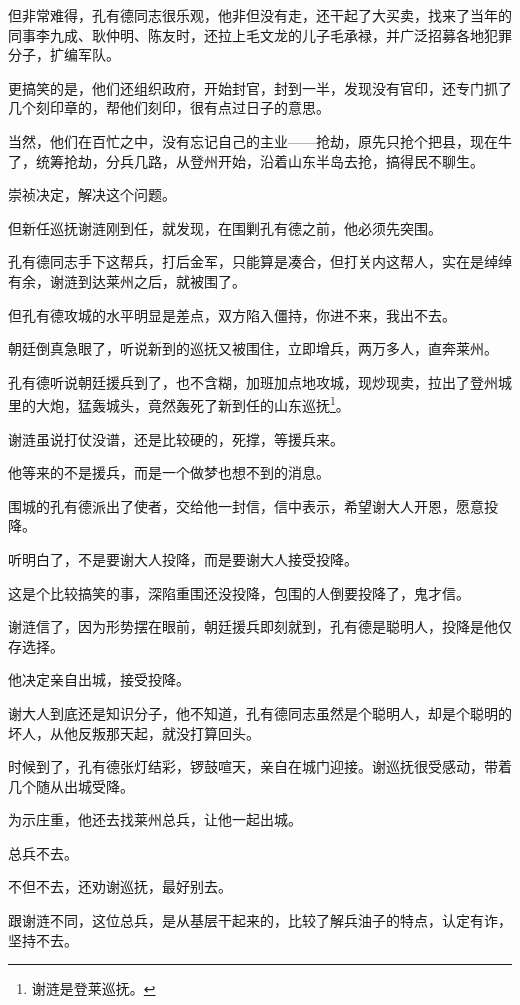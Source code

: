 \begin{multicols}{\theparacolNo}
		但非常难得，孔有德同志很乐观，他非但没有走，还干起了大买卖，找来了当年的同事李九成、耿仲明、陈友时，还拉上毛文龙的儿子毛承禄，并广泛招募各地犯罪分子，扩编军队。

		更搞笑的是，他们还组织政府，开始封官，封到一半，发现没有官印，还专门抓了几个刻印章的，帮他们刻印，很有点过日子的意思。

		当然，他们在百忙之中，没有忘记自己的主业——抢劫，原先只抢个把县，现在牛了，统筹抢劫，分兵几路，从登州开始，沿着山东半岛去抢，搞得民不聊生。

		崇祯决定，解决这个问题。

		但新任巡抚谢涟刚到任，就发现，在围剿孔有德之前，他必须先突围。

		孔有德同志手下这帮兵，打后金军，只能算是凑合，但打关内这帮人，实在是绰绰有余，谢涟到达莱州之后，就被围了。

		但孔有德攻城的水平明显是差点，双方陷入僵持，你进不来，我出不去。

		朝廷倒真急眼了，听说新到的巡抚又被围住，立即增兵，两万多人，直奔莱州。

		孔有德听说朝廷援兵到了，也不含糊，加班加点地攻城，现炒现卖，拉出了登州城里的大炮，猛轰城头，竟然轰死了新到任的山东巡抚\footnote{谢涟是登莱巡抚。}。

		谢涟虽说打仗没谱，还是比较硬的，死撑，等援兵来。

		他等来的不是援兵，而是一个做梦也想不到的消息。

		围城的孔有德派出了使者，交给他一封信，信中表示，希望谢大人开恩，愿意投降。

		听明白了，不是要谢大人投降，而是要谢大人接受投降。

		这是个比较搞笑的事，深陷重围还没投降，包围的人倒要投降了，鬼才信。

		谢涟信了，因为形势摆在眼前，朝廷援兵即刻就到，孔有德是聪明人，投降是他仅存选择。

		他决定亲自出城，接受投降。

		谢大人到底还是知识分子，他不知道，孔有德同志虽然是个聪明人，却是个聪明的坏人，从他反叛那天起，就没打算回头。

		时候到了，孔有德张灯结彩，锣鼓喧天，亲自在城门迎接。谢巡抚很受感动，带着几个随从出城受降。

		为示庄重，他还去找莱州总兵，让他一起出城。

		总兵不去。

		不但不去，还劝谢巡抚，最好别去。

		跟谢涟不同，这位总兵，是从基层干起来的，比较了解兵油子的特点，认定有诈，坚持不去。


\end{multicols}

